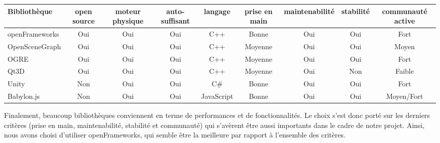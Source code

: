 \newpage
\begin{landscape}
\hspace{-4.5cm} 
\begin{tabular}{l|c|c|c|c|c|c|c|c}
Bibliothèque & open source & moteur physique & auto-suffisant & langage & prise en main & maintenabilité & stabilité & communauté active\\
\hline
openFrameworks & Oui & Oui & Oui & C++ & Bonne & Oui & Oui & Fort\\
OpenSceneGraph & Oui & Oui & Oui & C++ & Moyenne & Oui & Oui & Moyen\\ 
OGRE & Oui & Oui & Oui & C++ & Moyenne & Oui & Oui & Fort\\
Qt3D & Oui & Oui & Oui & C++ & Moyenne & Oui & Non & Faible\\
Unity & Non & Oui & Oui & C\# & Bonne & Oui & Oui & Fort\\
Babylon.js  & Non & Oui & Oui & JavaScript & Bonne & Oui & Oui & Moyen/Fort
\end{tabular}
\end{landscape}

Finalement, beaucoup bibliothèques conviennent en terme de performances et de fonctionnalités. Le choix s'est donc porté sur les derniers critères (prise en main, maintenabilité, stabilité et communauté) qui s'avèrent être aussi importants dans le cadre de notre projet. Ainsi, nous avons choisi d'utiliser openFrameworks, qui semble être la meilleure par rapport à l'ensemble des critères.  
